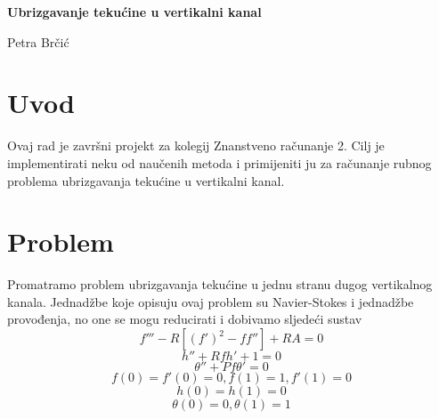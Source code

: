 \documentclass[a4paper,12pt]{article}
\newtheorem{thm}{Teorem}[section]
\newtheorem{defn}[thm]{Definicija}
\newenvironment{proof}{\quad {Dokaz:}}{\hfill}
\begin{document}
\begin{titlepage}
    \centering
    \vspace*{\fill}
    \vspace*{0.5cm}
    \huge\bfseries
    Ubrizgavanje tekućine u vertikalni kanal
    \vspace*{0.5cm}

    \large Petra Brčić
    \vspace*{\fill}
\end{titlepage}


\section{Uvod}

Ovaj rad je završni projekt za kolegij Znanstveno računanje 2. Cilj je implementirati neku od naučenih metoda i primijeniti ju za računanje rubnog problema ubrizgavanja tekućine u vertikalni kanal. 





\section{Problem}

Promatramo problem ubrizgavanja tekućine u jednu stranu dugog vertikalnog kanala. Jednadžbe koje opisuju ovaj problem su Navier-Stokes i jednadžbe provođenja, no one se mogu reducirati i dobivamo sljedeći sustav
\[ f''' - R [(f')^2 - ff''] + RA = 0 \]
\[ h'' + Rfh' + 1 = 0 \]
\[ \theta'' + Pf\theta' = 0 \]
\[ f(0)=f'(0)=0, f(1)=1, f'(1)=0 \]
\[ h(0)=h(1)=0 \]
\[ \theta(0)=0, \theta(1)=1 \]
\end{document}

